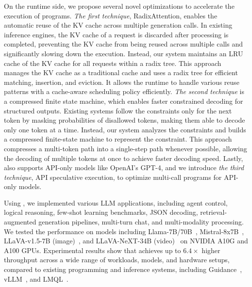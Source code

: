 On the runtime side, we propose several novel optimizations to accelerate the execution of \lang programs. \textit{The first technique}, RadixAttention, enables the automatic reuse of the KV cache across multiple generation calls. In existing inference engines, the KV cache of a request is discarded after processing is completed, preventing the KV cache from being reused across multiple calls and significantly slowing down the execution. Instead, our system maintains an LRU cache of the KV cache for all requests within a radix tree. This approach manages the KV cache as a traditional cache and uses a radix tree for efficient matching, insertion, and eviction. It allows the runtime to handle various reuse patterns with a cache-aware scheduling policy efficiently.
\textit{The second technique} is a compressed finite state machine, which enables faster constrained decoding for structured outputs. Existing systems follow the constraints only for the next token by masking probabilities of disallowed tokens, making them able to decode only one token at a time. Instead, our system analyzes the constraints and builds a compressed finite-state machine to represent the constraint. This approach compresses a multi-token path into a single-step path whenever possible, allowing the decoding of multiple tokens at once to achieve faster decoding speed.
Lastly, \lang also supports API-only models like OpenAI's GPT-4, and we introduce \textit{the third technique}, API speculative execution, to optimize multi-call programs for API-only models.

Using \lang, we implemented various LLM applications, including agent control, logical reasoning, few-shot learning benchmarks, JSON decoding, retrieval-augmented generation pipelines, multi-turn chat, and multi-modality processing. We tested the performance on models including Llama-7B/70B~\cite{touvron2023llama2}, Mistral-8x7B~\cite{jiang2024mixtral}, LLaVA-v1.5-7B (image)~\cite{liu2024llavanext}, and LLaVA-NeXT-34B (video)~\cite{zhang2024llavanextvideo} on NVIDIA A10G and A100 GPUs. Experimental results show that \lang achieves up to $6.4\times$ higher throughput across a wide range of workloads, models, and hardware setups, compared to existing programming and inference systems, including Guidance~\cite{guidance}, vLLM~\cite{kwon2023vllm}, and LMQL~\cite{beurer2023lmql}.





 






